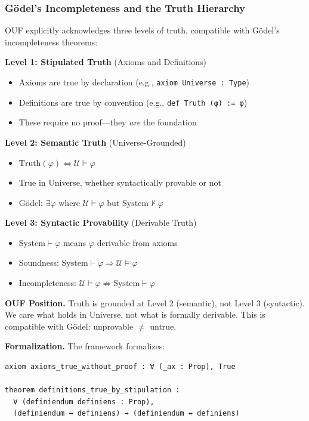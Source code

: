 \subsubsection{Gödel's Incompleteness and the Truth Hierarchy}

OUF explicitly acknowledges three levels of truth, compatible with Gödel's incompleteness theorems:

\textbf{Level 1: Stipulated Truth} (Axioms and Definitions)
\begin{itemize}
\item Axioms are true by declaration (e.g., \texttt{axiom Universe : Type})
\item Definitions are true by convention (e.g., \texttt{def Truth (φ) := φ})
\item These require no proof---they \emph{are} the foundation
\end{itemize}

\textbf{Level 2: Semantic Truth} (Universe-Grounded)
\begin{itemize}
\item $\text{Truth}(\varphi) \iff \mathcal{U} \models \varphi$
\item True in Universe, whether syntactically provable or not
\item Gödel: $\exists \varphi$ where $\mathcal{U} \models \varphi$ but $\text{System} \not\vdash \varphi$
\end{itemize}

\textbf{Level 3: Syntactic Provability} (Derivable Truth)
\begin{itemize}
\item $\text{System} \vdash \varphi$ means $\varphi$ derivable from axioms
\item Soundness: $\text{System} \vdash \varphi \Rightarrow \mathcal{U} \models \varphi$
\item Incompleteness: $\mathcal{U} \models \varphi \not\Rightarrow \text{System} \vdash \varphi$
\end{itemize}

\textbf{OUF Position.} Truth is grounded at Level 2 (semantic), not Level 3 (syntactic). We care what holds in Universe, not what is formally derivable. This is compatible with Gödel: unprovable $\neq$ untrue.

\textbf{Formalization.} The framework formalizes:
\begin{lstlisting}[language=lean]
axiom axioms_true_without_proof : ∀ (_ax : Prop), True

theorem definitions_true_by_stipulation : 
  ∀ (definiendum definiens : Prop), 
  (definiendum ↔ definiens) → (definiendum ↔ definiens)
\end{lstlisting}

